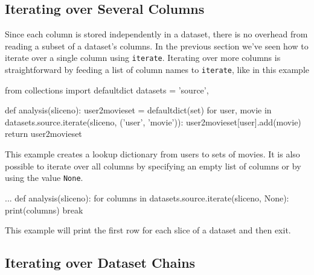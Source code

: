 \subsection{Iterating over Several Columns}
Since each column is stored independently in a dataset, there is no
overhead from reading a subset of a dataset's columns.  In the
previous section we've seen how to iterate over a single column using
\texttt{iterate}.  Iterating over more columns is straightforward by
feeding a list of column names to \texttt{iterate}, like in this
example
\begin{python}
from collections import defaultdict
datasets = {'source',}

def analysis(sliceno):
    user2movieset = defaultdict(set)
    for user, movie in datasets.source.iterate(sliceno, ('user', 'movie')):
    user2movieset[user].add(movie)
    return user2movieset
\end{python}
This example creates a lookup dictionary from users to sets of movies.
It is also possible to iterate over all columns by specifying an empty
list of columns or by using the value \texttt{None}.
\begin{python}
...
def analysis(sliceno):
    for columns in datasets.source.iterate(sliceno, None):
    print(columns)
    break
\end{python}
This example will print the first row for each slice of a dataset and
then exit.


\subsection{Iterating over Dataset Chains}

